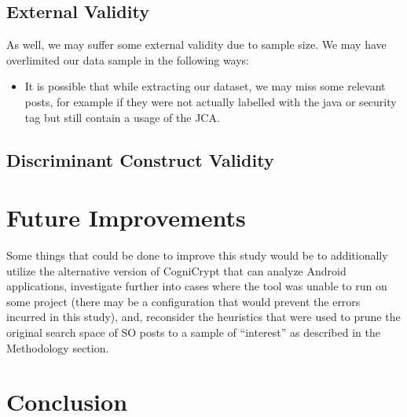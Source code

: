 \documentclass[10pt, conference]{IEEEtran}
\begin{document}
\subsection{External Validity}
As well, we may suffer some external validity due to sample size. We may have overlimited our data sample in the following ways:

\begin{itemize}
\item
It is possible that while extracting our dataset, we may miss some relevant posts, for example if they were not actually labelled with the java or security tag but still contain a usage of the JCA. 


\end{itemize}

\subsection{Discriminant Construct Validity}



\section{Future Improvements}
Some things that could be done to improve this study would be to additionally utilize the alternative version of CogniCrypt that can analyze Android applications, investigate further into cases where the tool was unable to run on some project (there may be a configuration that would prevent the errors incurred in this study), and, reconsider the heuristics that were used to prune the original search space of SO posts to a sample of “interest” as described in the Methodology section. 

\section{Conclusion}


\printbibliography
\end{document}
